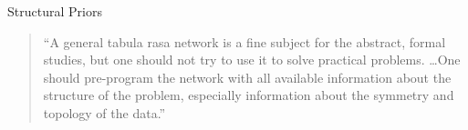 \documentclass[t,xcolor=dvipsnames]{beamer}
\begin{document}

\begin{frame}{Structural Priors}
\begin{quote}
		``A general tabula rasa network is a fine subject for the abstract, formal studies, but one should not try to use it to solve practical problems. \ldots One should pre-program the network with all available information about the structure of the problem, especially information about the symmetry and topology of the data.''\\
\end{quote}
\end{frame}
\end{document}
